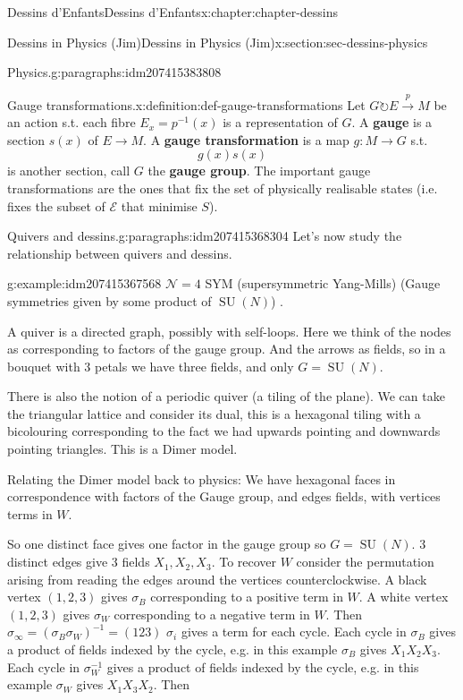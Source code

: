 \documentclass[oneside,10pt,]{book}
\newcommand{\terminology}[1]{\textbf{#1}}
\numberwithin{equation}{section}
\newcommand{\inv}{^{-1}}
\newcommand{\acts}{\circlearrowright}
\DeclareMathOperator{\specialunitary}{SU}
\begin{document}
\begin{chapterptx}{Dessins d'Enfants}{}{Dessins d'Enfants}{}{}{x:chapter:chapter-dessins}
\begin{sectionptx}{Dessins in Physics (Jim)}{}{Dessins in Physics (Jim)}{}{}{x:section:sec-dessins-physics}
\begin{paragraphs}{Physics.}{g:paragraphs:idm207415383808}
\begin{definition}{Gauge transformations.}{x:definition:def-gauge-transformations}
Let \(G \acts E \xrightarrow p M\) be an action s.t. each fibre \(E_x = p \inv(x)\) is a representation of \(G\). A \terminology{gauge} is a section \(s(x)\) of \(E \to M\). A \terminology{gauge transformation} is a map \(g\colon M \to G\) s.t.%
\begin{equation*}
g(x) s(x)
\end{equation*}
is another section, call \(G\) the \terminology{gauge group}. The important gauge transformations are the ones that fix the set of physically realisable states (i.e. fixes the subset of \(\mathcal E\) that minimise \(S\)).%
\end{definition}
\end{paragraphs}%
\begin{paragraphs}{Quivers and dessins.}{g:paragraphs:idm207415368304}%
Let's now study the relationship between quivers and dessins.%
\begin{example}{}{g:example:idm207415367568}%
\(\mathcal N = 4\) SYM (supersymmetric Yang-Mills) (Gauge symmetries given by some product of \(\specialunitary (N)\)) .%
\end{example}
A quiver is a directed graph, possibly with self-loops. Here we think of the nodes as corresponding to factors of the gauge group. And the arrows as fields, so in a bouquet with 3 petals we have three fields, and only \(G = \specialunitary (N)\).%
\par
There is also the notion of a periodic quiver (a tiling of the plane). We can take the triangular lattice and consider its dual, this is a hexagonal tiling with a bicolouring corresponding to the fact we had upwards pointing and downwards pointing triangles. This is a Dimer model.%
\par
Relating the Dimer model back to physics: We have hexagonal faces in correspondence with factors of the Gauge group, and edges fields, with vertices terms in \(W\).%
\par
So one distinct face gives one factor in the gauge group so \(G = \specialunitary (N)\). 3 distinct edges give 3 fields \(X_1, X_2, X_3\). To recover \(W\) consider the permutation arising from reading the edges around the vertices counterclockwise. A black vertex \((1,2,3)\) gives \(\sigma_B\) corresponding to a positive term in \(W\). A white vertex \((1,2,3)\) gives \(\sigma_W\) corresponding to a negative term in \(W\). Then \(\sigma_\infty = (\sigma_B\sigma_W)\inv = (123)\) \(\sigma_i\) gives a term for each cycle. Each cycle in \(\sigma_B\) gives a product of fields indexed by the cycle, e.g. in this example \(\sigma_B\) gives \(X_1X_2X_3\). Each cycle in \(\sigma_W\inv\) gives a product of fields indexed by the cycle, e.g. in this example \(\sigma_W\) gives \(X_1X_3X_2\). Then%

\end{paragraphs}
\end{sectionptx}
\end{chapterptx}
\end{document}
